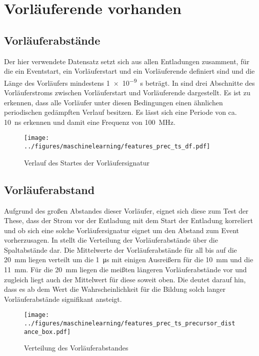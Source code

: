 \section{Vorläuferende vorhanden}
\subsection{Vorläuferabstände}
\label{sec:precursor}
Der hier verwendete Datensatz setzt sich aus allen Entladungen zusamment, für die ein Eventstart, ein Vorläuferstart und ein Vorläuferende definiert sind und die Länge des Vorläufers mindestens \SI{1e-9}{\s} beträgt. In  sind drei Abschnitte des Vorläuferstroms zwischen Vorläuferstart und Vorläuferende dargestellt. Es ist zu erkennen, dass alle Vorläufer unter diesen Bedingungen einen ähnlichen periodischen gedämpften Verlauf besitzen. Es lässt sich eine Periode von ca. \SI{10}{\nano\second} erkennen und damit eine Frequenz von \SI{100}{\mega\hertz}. 

\begin{figure}[H]
    \centering
      \texttt{[image: ../figures/maschinelearning/features\_prec\_ts\_df.pdf]}
      \caption{Verlauf des Startes der Vorläufersignatur}
      \label{fig:precursor_current_sliece}
\end{figure}

\subsection{Vorläuferabstand}
Aufgrund des großen Abstandes dieser Vorläufer, eignet sich diese zum Test der These, dass der Strom vor der Entladung mit dem Start der Entladung korreliert und ob sich eine solche Vorläufersignatur eignet um den Abstand zum Event vorherzusagen. In  stellt die Verteilung der Vorläuferabstände über die Spaltabstände dar. Die Mittelwerte der Vorläuferabstände für all bis auf die \SI{20}{\milli\meter} liegen verteilt um die \SI{1}{\micro\second} mit einigen Ausreißern für die \SI{10}{\milli\meter} und die \SI{11}{\milli\meter}. Für die \SI{20}{\milli\meter} liegen die meißten längeren Vorläuferabstände vor und zugleich liegt auch der Mittelwert für diese soweit oben. Die deutet darauf hin, dass es ab dem Wert die Wahrscheinlichkeit für die Bildung solch langer Vorläuferabstände signifikant ansteigt.

\begin{figure}[H]
    \centering
      \texttt{[image: ../figures/maschinelearning/features\_prec\_ts\_precursor\_distance\_box.pdf]}
      \caption{Verteilung des Vorläuferabstandes}
      \label{fig:prec_ts_prec_distance_box}
\end{figure}



